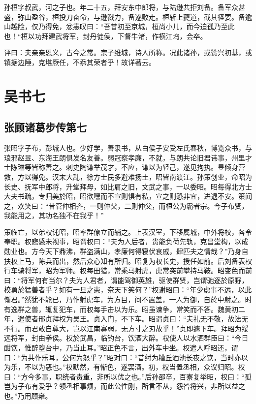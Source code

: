 \documentclass[12pt,UTF8]{ctexbook}
\begin{document}
孙桓字叔武，河之子也。年二十五，拜安东中郎将，与陆逊共拒刘备。备军众甚盛，弥山盈谷，桓投刀奋命，与逊戮力，备遂败走。桓斩上夔道，截其径要。备逾山越险，仅乃得免，忿恚叹曰：“吾昔初至京城，桓尚小儿，而今迫孤乃至此也！“桓以功拜建武将军，封丹徒侯，下督牛渚，作横江坞，会卒。

评曰：夫亲亲恩义，古今之常。宗子维城，诗人所称。况此诸孙，或赞兴初基，或镇据边陲，克堪厥任，不忝其荣者乎！故详著云。

\part{吴书七}
\chapter{张顾诸葛步传第七}

张昭字子布，彭城人也。少好学，善隶书，从白侯子安受左氏春秋，博览众书，与琅邪赵昱、东海王朗俱发名友善。弱冠察孝廉，不就，与朗共论旧君讳事，州里才士陈琳等皆称善之。刺史陶谦举茂才，不应，谦以为轻己，遂见拘执。昱倾身营救，方以得免。汉末大乱，徐方士民多避难扬土，昭皆南渡江。孙策创业，命昭为长史、抚军中郎将，升堂拜母，如比肩之旧，文武之事，一以委昭。昭每得北方士大夫书疏，专归美於昭，昭欲嘿而不宣则惧有私，宣之则恐非宜，进退不安。策闻之，欢笑曰：“昔管仲相齐，一则仲父，二则仲父，而桓公为霸者宗。今子布贤，我能用之，其功名独不在我乎！”

策临亡，以弟权讬昭，昭率群僚立而辅之。上表汉室，下移属城，中外将校，各令奉职。权悲感未视事，昭谓权曰：“夫为人后者，贵能负荷先轨，克昌堂构，以成勋业也。方今天下鼎沸，群盗满山，孝廉何得寝伏哀戚，肆匹夫之情哉？”乃身自扶权上马，陈兵而出，然后众心知有所归。昭复为权长史，授任如前。后刘备表权行车骑将军，昭为军师。权每田猎，常乘马射虎，虎常突前攀持马鞍。昭变色而前曰：“将军何有当尔？夫为人君者，谓能驾御英雄，驱使群贤，岂谓驰逐於原野，校勇於猛兽者乎？如有一旦之患，奈天下笑何？”权谢昭曰：“年少虑事不远，以此惭君。”然犹不能已，乃作射虎车，为方目，间不置盖，一人为御，自於中射之。时有逸群之兽，辄复犯车，而权每手击以为乐。昭虽谏争，常笑而不答。魏黄初二年，遣使者邢贞拜权为吴王。贞入门，不下车。昭谓贞曰：“夫礼无不敬，故法无不行。而君敢自尊大，岂以江南寡弱，无方寸之刃故乎！”贞即遽下车。拜昭为绥远将军，封由拳侯。权於武昌，临钓台，饮酒大醉。权使人以水洒群臣曰：“今日酣饮，惟醉堕台中，乃当止耳。”昭正色不言，出外车中坐。权遣人呼昭还，谓曰：“为共作乐耳，公何为怒乎？”昭对曰：“昔纣为糟丘酒池长夜之饮，当时亦以为乐，不以为恶也。”权默然，有惭色，遂罢酒。初，权当置丞相，众议归昭。权曰：“方今多事，职统者责重，非所以优之也。”后孙邵卒，百寮复举昭，权曰：“孤岂为子布有爱乎？领丞相事烦，而此公性刚，所言不从，怨咎将兴，非所以益之也。”乃用顾雍。
\end{document}
